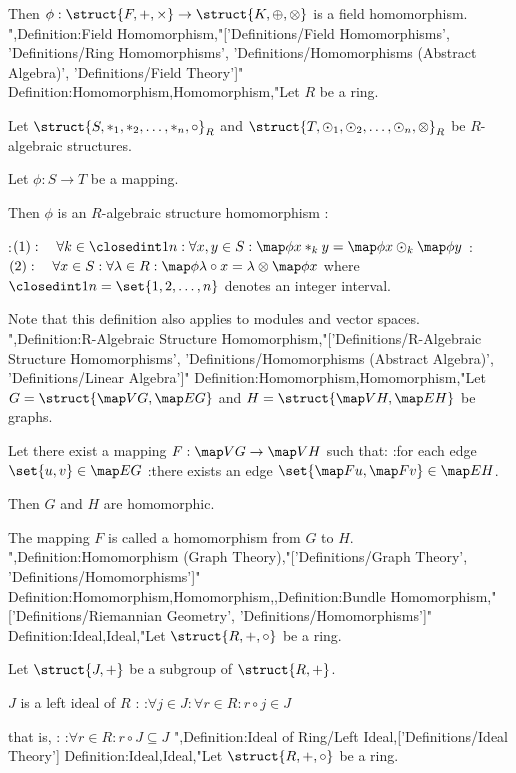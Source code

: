 Then $\phi: \struct {F, +, \times} \to \struct {K, \oplus, \otimes}$ is a field homomorphism.
",Definition:Field Homomorphism,"['Definitions/Field Homomorphisms', 'Definitions/Ring Homomorphisms', 'Definitions/Homomorphisms (Abstract Algebra)', 'Definitions/Field Theory']"
Definition:Homomorphism,Homomorphism,"Let $R$ be a ring.

Let $\struct {S, \ast_1, \ast_2, \ldots, \ast_n, \circ}_R$ and $\struct {T, \odot_1, \odot_2, \ldots, \odot_n, \otimes}_R$ be $R$-algebraic structures.

Let $\phi: S \to T$ be a mapping.


Then $\phi$ is an $R$-algebraic structure homomorphism :

:$(1): \quad \forall k \in \closedint 1 n: \forall x, y \in S: \map \phi {x \ast_k y} = \map \phi x \odot_k \map \phi y$
:$(2): \quad \forall x \in S: \forall \lambda \in R: \map \phi {\lambda \circ x} = \lambda \otimes \map \phi x$
where $\closedint 1 n = \set {1, 2, \ldots, n}$ denotes an integer interval.


Note that this definition also applies to modules and vector spaces.
",Definition:R-Algebraic Structure Homomorphism,"['Definitions/R-Algebraic Structure Homomorphisms', 'Definitions/Homomorphisms (Abstract Algebra)', 'Definitions/Linear Algebra']"
Definition:Homomorphism,Homomorphism,"Let $G = \struct {\map V G, \map E G}$ and $H = \struct {\map V H, \map E H}$ be graphs.


Let there exist a mapping $F: \map V G \to \map V H$ such that:
:for each edge $\set {u, v} \in \map E G$
:there exists an edge $\set {\map F u, \map F v} \in \map E H$.


Then $G$ and $H$ are homomorphic.

The mapping $F$ is called a homomorphism from $G$ to $H$.
",Definition:Homomorphism (Graph Theory),"['Definitions/Graph Theory', 'Definitions/Homomorphisms']"
Definition:Homomorphism,Homomorphism,,Definition:Bundle Homomorphism,"['Definitions/Riemannian Geometry', 'Definitions/Homomorphisms']"
Definition:Ideal,Ideal,"Let $\struct {R, +, \circ}$ be a ring.

Let $\struct {J, +}$ be a subgroup of $\struct {R, +}$.


$J$ is a left ideal of $R$ :
:$\forall j \in J: \forall r \in R: r \circ j \in J$

that is, :
:$\forall r \in R: r \circ J \subseteq J$
",Definition:Ideal of Ring/Left Ideal,['Definitions/Ideal Theory']
Definition:Ideal,Ideal,"Let $\struct {R, +, \circ}$ be a ring.

